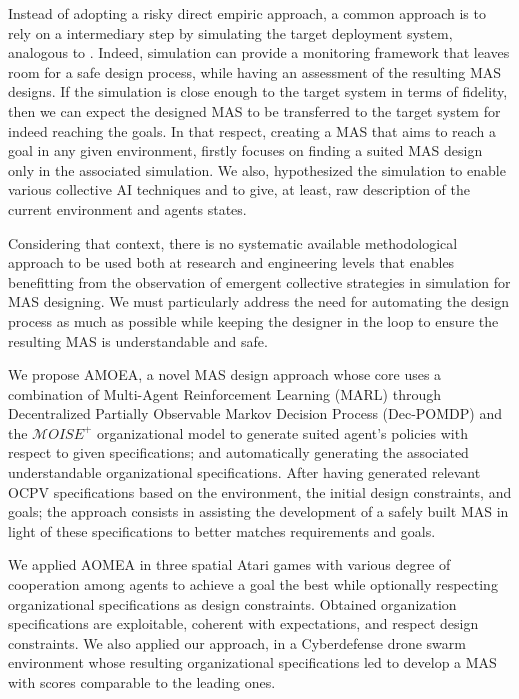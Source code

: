 \documentclass[runningheads]{llncs}
\begin{document}

Instead of adopting a risky direct empiric approach, a common approach is to rely on a intermediary step by simulating the target deployment system, analogous to . Indeed, simulation can provide a monitoring framework that leaves room for a safe design process, while having an assessment of the resulting MAS designs. If the simulation is close enough to the target system in terms of fidelity, then we can expect the designed MAS to be transferred to the target system for indeed reaching the goals.
In that respect, creating a MAS that aims to reach a goal in any given environment, firstly focuses on finding a suited MAS design only in the associated simulation. We also, hypothesized the simulation to enable various collective AI techniques and to give, at least, raw description of the current environment and agents states.

Considering that context, there is no systematic available methodological approach to be used both at research and engineering levels that enables benefitting from the observation of emergent collective strategies in simulation for MAS designing. We must particularly address the need for automating the design process as much as possible while keeping the designer in the loop to ensure the resulting MAS is understandable and safe.


We propose AMOEA, a novel MAS design approach whose core uses a combination of Multi-Agent Reinforcement Learning (MARL) through Decentralized Partially Observable Markov Decision Process (Dec-POMDP) and the $\mathcal{M}OISE^+$ organizational model to generate suited agent's policies with respect to given specifications; and automatically generating the associated understandable organizational specifications. After having generated relevant OCPV specifications based on the environment, the initial design constraints, and goals; the approach consists in assisting the development of a safely built MAS in light of these specifications to better matches requirements and goals.


We applied AOMEA in three spatial Atari games with various degree of cooperation among agents to achieve a goal the best while optionally respecting organizational specifications as design constraints. Obtained organization specifications are exploitable, coherent with expectations, and respect design constraints. We also applied our approach, in a Cyberdefense drone swarm environment whose resulting organizational specifications led to develop a MAS with scores comparable to the leading ones.
\end{document}
